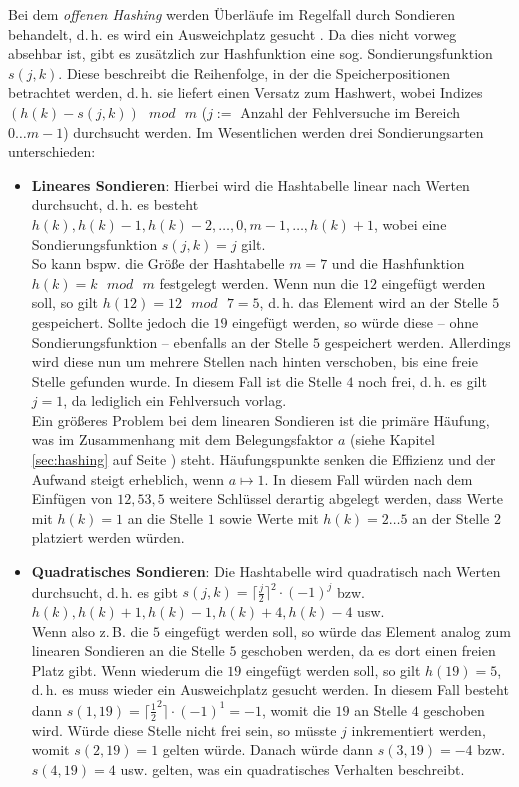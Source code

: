 \label{sec:offen}
Bei dem \emph{offenen Hashing} werden Überläufe im Regelfall durch Sondieren behandelt, d.\,h. es wird ein Ausweichplatz gesucht \cite{p1957}. Da dies nicht vorweg absehbar ist, gibt es zusätzlich zur Hashfunktion eine sog. Sondierungsfunktion $s(j,k)$. Diese beschreibt die Reihenfolge, in der die Speicherpositionen betrachtet werden, d.\,h. sie liefert einen Versatz zum Hashwert, wobei Indizes $(h(k)-s(j,k)) \text{ } mod \text{ } m$ ($j := $ Anzahl der Fehlversuche im Bereich $0 \dots m-1$) durchsucht werden. Im Wesentlichen werden drei Sondierungsarten unterschieden:
\begin{itemize}
	\item \textbf{Lineares Sondieren}: Hierbei wird die Hashtabelle linear nach Werten durchsucht, d.\,h. es besteht $h(k), h(k)-1, h(k)-2, \dots, 0, m-1, \dots, h(k)+1$, wobei eine Sondierungsfunktion $s(j,k)=j$ gilt.\\
	So kann bspw. die Größe der Hashtabelle $m = 7$ und die Hashfunktion $h(k) = k \text{ } mod \text{ } m$ festgelegt werden. Wenn nun die $12$ eingefügt werden soll, so gilt $h(12) = 12 \text{ } mod \text{ } 7 = 5$, d.\,h. das Element wird an der Stelle $5$ gespeichert. Sollte jedoch die $19$ eingefügt werden, so würde diese -- ohne Sondierungsfunktion -- ebenfalls an der Stelle $5$ gespeichert werden. Allerdings wird diese nun um mehrere Stellen nach hinten verschoben, bis eine freie Stelle gefunden wurde. In diesem Fall ist die Stelle $4$ noch frei, d.\,h. es gilt $j = 1$, da lediglich ein Fehlversuch vorlag.\\
	Ein größeres Problem bei dem linearen Sondieren ist die primäre Häufung, was im Zusammenhang mit dem Belegungsfaktor $a$ (siehe Kapitel \ref{sec:hashing} auf Seite \pageref{sec:hashing}) steht. Häufungspunkte senken die Effizienz und der Aufwand steigt erheblich, wenn $a \mapsto 1$. In diesem Fall würden nach dem Einfügen von $12, 53, 5$ weitere Schlüssel derartig abgelegt werden, dass Werte mit $h(k) = 1$ an die Stelle $1$ sowie Werte mit $h(k) = 2 \dots 5$ an der Stelle $2$ platziert werden würden.
	\item \textbf{Quadratisches Sondieren}: Die Hashtabelle wird quadratisch nach Werten durchsucht, d.\,h. es gibt $s(j,k) = \lceil \frac{j}{2} \rceil^2 \cdot (-1)^j$ bzw. $h(k), h(k)+1, h(k)-1, h(k)+4, h(k)-4$ usw.\\
	Wenn also z.\,B. die $5$ eingefügt werden soll, so würde das Element analog zum linearen Sondieren an die Stelle $5$ geschoben werden, da es dort einen freien Platz gibt. Wenn wiederum die $19$ eingefügt werden soll, so gilt $h(19) = 5$, d.\,h. es muss wieder ein Ausweichplatz gesucht werden. In diesem Fall besteht dann $s(1, 19) = \lceil \frac{1}{2}^2\rceil \cdot (-1)^1 = -1$, womit die $19$ an Stelle $4$ geschoben wird. Würde diese Stelle nicht frei sein, so müsste $j$ inkrementiert werden, womit $s(2, 19)=1$ gelten würde. Danach würde dann $s(3, 19)=-4$ bzw. $s(4, 19)=4$ usw. gelten, was ein quadratisches Verhalten beschreibt.\\

\end{itemize}
